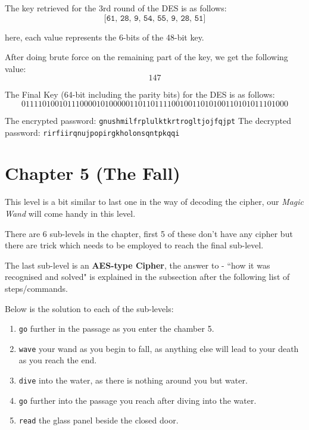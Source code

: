 \documentclass[10pt,twoside]{article}
\begin{document}
The key retrieved for the 3rd round of the DES is as follows:
$$\texttt{[61, 28, 9, 54, 55, 9, 28, 51]}$$

here, each value represents the 6-bits of the 48-bit key. \newline 

After doing brute force on the remaining part of the key, we get the following value:
$$147$$

The Final Key (64-bit including the parity bits) for the DES is as follows:
$$0111101001011100001010000011011011110010011010100110101011101000$$

The encrypted password: \texttt{gnushmilfrplulktkrtrogltjojfqjpt} \newline
The decrypted password: \texttt{rirfiirqnujpopirgkholonsqntpkqqi}

\newpage
\section{Chapter 5 (The Fall)}
This level is a bit similar to last one in the way of decoding the cipher, our \textit{Magic Wand} will come handy in this level. \newline

There are 6 sub-levels in the chapter, first 5 of these don't have any cipher but there are trick which needs to be employed to reach the final sub-level. \newline

The last sub-level is an \textbf{AES-type Cipher}, the answer to - ``how it was recognised and solved" is explained in the subsection after the following list of steps/commands. \newline

Below is the solution to each of the sub-levels:
\begin{enumerate}
  \setlength\itemsep{0em}
  \item \texttt{go} further in the passage as you enter the chamber 5.
  \item \texttt{wave} your wand as you begin to fall, as anything else will lead to your death as you reach the end.
  \item \texttt{dive} into the water, as there is nothing around you but water.
  \item \texttt{go} further into the passage you reach after diving into the water.
  \item \texttt{read} the glass panel beside the closed door. \newline
\end{enumerate}
\end{document}
